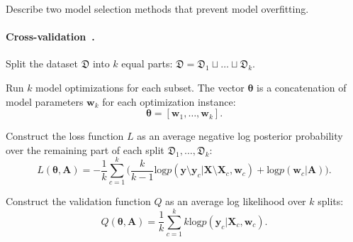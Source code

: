 \documentclass[smallcondensed]{svjour3}
\begin{document}
Describe two model selection methods that prevent model overfitting.

\paragraph{Cross-validation~\cite{cv_ms}.}
Split the dataset  $\mathfrak{D}$ into $k$ equal parts:
$
\mathfrak{D} = \mathfrak{D}_1 \sqcup \dots \sqcup \mathfrak{D}_k.
$


Run $k$ model optimizations for each subset. The vector $\boldsymbol{\theta}$ is a concatenation of model parameters $\mathbf{w}_k$ for each optimization instance:
\[
\boldsymbol{\theta} = [\mathbf{w}_1, \dots, \mathbf{w}_k].
\]
 
Construct the loss function $L$ as an average negative log posterior probability over the remaining part of each split $\mathfrak{D}_1, \dots, \mathfrak{D}_k$:  
\begin{equation}
\label{eq:cv}
L(\boldsymbol{\theta}, \mathbf{A}) = -\frac{1}{k}\sum_{c=1}^k \bigl(\frac{k}{k-1}\text{log}p(\mathbf{y} \setminus \mathbf{y}_c|\mathbf{X}\setminus \mathbf{X}_c, \mathbf{w}_c) + \text{log}p(\mathbf{w}_c|\mathbf{A})\bigr).
\end{equation}

Construct the validation function $Q$ as an average log likelihood over $k$ splits:
\begin{equation}
\label{eq:cvq}
Q(\boldsymbol{\theta}, \mathbf{A}) = \frac{1}{k}\sum_{c=1}^k k\text{log}p(\mathbf{y}_c|\mathbf{X}_c, \mathbf{w}_c).
\end{equation}
\end{document}
